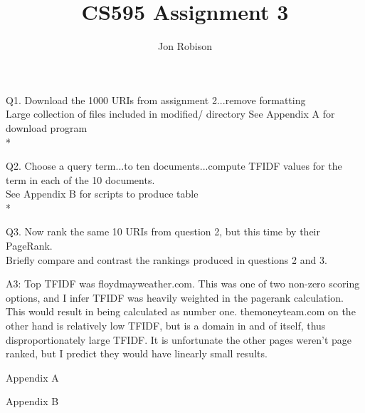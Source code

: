 \documentclass{article}
\begin{document}
\author{Jon Robison}
\title{CS595 Assignment 3}
\maketitle

Q1. Download the 1000 URIs from assignment 2...remove formatting \\
Large collection of files included in modified/ directory
See Appendix A for download program
\\*

Q2. Choose a query term...to ten documents...compute TFIDF values for the term
in each of the 10 documents. \\
%
See Appendix B for scripts to produce table
\\*

Q3. Now rank the same 10 URIs from question 2, but this time by their
PageRank. \\
%
Briefly compare and contrast the rankings produced in questions 2
and 3.

A3: Top TFIDF was floydmayweather.com. This was one of two non-zero scoring
options, and I infer TFIDF was heavily weighted in the pagerank calculation.
This would result in being calculated as number one. themoneyteam.com on the
other hand is relatively low TFIDF, but is a domain in and of itself, thus
disproportionately large TFIDF. It is unfortunate the other pages weren't
page ranked, but I predict they would have linearly small results.

\newpage
\appendix
Appendix A


\newpage
Appendix B



\end{document}
